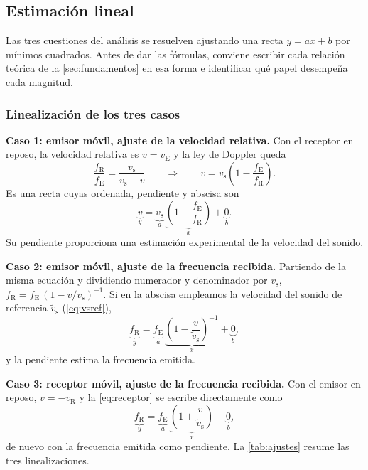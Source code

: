 \documentclass[a4paper,11pt]{amsart}
\numberwithin{equation}{section}
\newcommand{\vs}{v_{\mathrm{s}}}              %
\newcommand{\vst}{\tilde{v}_{\mathrm{s}}}     %
\newcommand{\vE}{v_{\mathrm{E}}}              %
\newcommand{\vR}{v_{\mathrm{R}}}              %
\newcommand{\fE}{f_{\mathrm{E}}}              %
\newcommand{\fR}{f_{\mathrm{R}}}              %
\theoremstyle{cienplano}
\theoremstyle{ciendef}
\theoremstyle{cienobs}
\newcounter{referencia}
\begin{document}
\newpage

\subsection{Estimación lineal}\label{sec:ajuste}
Las tres cuestiones del análisis se resuelven ajustando una recta $y=ax+b$ por
mínimos cuadrados. Antes de dar las fórmulas, conviene escribir cada relación
teórica de la \cref{sec:fundamentos} en esa forma e identificar qué papel desempeña
cada magnitud.

\subsubsection{Linealización de los tres casos}

\textbf{Caso 1: emisor móvil, ajuste de la velocidad relativa.} Con el receptor
en reposo, la velocidad relativa es $v=\vE$ y la ley de Doppler queda
\begin{equation*}
  \frac{\fR}{\fE}=\frac{\vs}{\vs-v}
  \qquad\Longrightarrow\qquad
  v=\vs\left(1-\frac{\fE}{\fR}\right).
\end{equation*}
Es una recta cuyas ordenada, pendiente y abscisa son
\begin{equation}\label{eq:lin1}
  \underbrace{v}_{y}=\underbrace{\vs}_{a}\,
  \underbrace{\left(1-\frac{\fE}{\fR}\right)}_{x}+\underbrace{0}_{b}.
\end{equation}
Su pendiente proporciona una estimación experimental de la velocidad del sonido.

\textbf{Caso 2: emisor móvil, ajuste de la frecuencia recibida.} Partiendo de
la misma ecuación y dividiendo numerador y denominador por $\vs$,
$\fR=\fE\,(1-v/\vs)^{-1}$. Si en la abscisa empleamos la velocidad del sonido de
referencia $\vst$ (\cref{eq:vsref}),
\begin{equation}\label{eq:lin2}
  \underbrace{\fR}_{y}=\underbrace{\fE}_{a}\,
  \underbrace{\left(1-\frac{v}{\vst}\right)^{-1}}_{x}+\underbrace{0}_{b},
\end{equation}
y la pendiente estima la frecuencia emitida.

\textbf{Caso 3: receptor móvil, ajuste de la frecuencia recibida.} Con el
emisor en reposo, $v=-\vR$ y la \cref{eq:receptor} se escribe directamente como
\begin{equation}\label{eq:lin3}
  \underbrace{\fR}_{y}=\underbrace{\fE}_{a}\,
  \underbrace{\left(1+\frac{v}{\vst}\right)}_{x}+\underbrace{0}_{b},
\end{equation}
de nuevo con la frecuencia emitida como pendiente. La \cref{tab:ajustes}
resume las tres linealizaciones.
\end{document}
